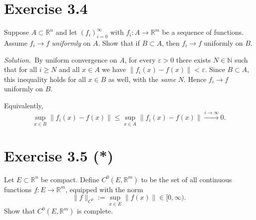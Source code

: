\documentclass[11pt,a4paper]{article}
\newenvironment{solution}{\par\noindent\textit{Solution.}\ }{\par\vspace{0.5em}}
\begin{document}
\section*{Exercise 3.4}
Suppose $A\subset\mathbb{R}^n$ and let $(f_i)_{i=0}^\infty$ with $f_i:A\to\mathbb{R}^m$ be a sequence of functions.
Assume $f_i\to f$ \emph{uniformly} on $A$. Show that if $B\subset A$, then $f_i\to f$ uniformly on $B$.

\begin{solution}By uniform convergence on $A$, for every $\varepsilon>0$ there exists $N\in\mathbb{N}$ such that
for all $i\ge N$ and all $x\in A$ we have $\|f_i(x)-f(x)\|<\varepsilon$. Since $B\subset A$, this inequality holds
for all $x\in B$ as well, with the \emph{same} $N$. Hence $f_i\to f$ uniformly on $B$. \end{solution}\medskip Equivalently,
\[
\sup_{x\in B}\|f_i(x)-f(x)\|\le \sup_{x\in A}\|f_i(x)-f(x)\|\xrightarrow{i\to\infty} 0.
\]

\section*{Exercise 3.5 (*)}
Let $E\subset\mathbb{R}^n$ be compact. Define $C^0(E,\mathbb{R}^m)$ to be the set of all continuous
functions $f:E\to\mathbb{R}^m$, equipped with the norm
\[
\|f\|_{C^0}:=\sup_{x\in E}\|f(x)\| \in [0,\infty).
\]
Show that $C^0(E,\mathbb{R}^m)$ is complete.
\end{document}
